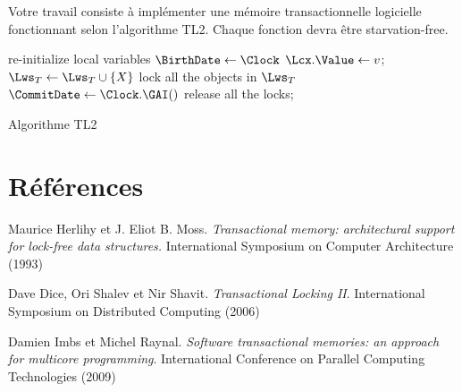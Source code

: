 \documentclass{td}
\begin{document}
Votre travail consiste à implémenter une mémoire transactionnelle logicielle fonctionnant selon l'algorithme TL2. Chaque fonction devra être starvation-free. 

\begin{algorithm}[t]
   {
    re-initialize local variables\;
    $\BirthDate \leftarrow \Clock$\;
  }
   {
    $\Lcx.\Value \leftarrow v$; 
    $\Lws_T\leftarrow \Lws_T \cup \{X\}$\;
  }
   {
  }
   {
    lock all the objects in $\Lws_T$\;
    $\CommitDate \leftarrow \Clock.\GAI()$\label{al:incr}\;
    release all the locks;
  }
  \caption{Algorithme TL2}
  \label{algo:TL2}
\end{algorithm}

\section{Références}

\renewcommand{\section}[2]{}%

\begin{thebibliography}{99}
  
  Maurice Herlihy et J. Eliot B. Moss. \emph{Transactional memory: architectural support for lock-free data structures.}
  International Symposium on Computer Architecture (1993)

  Dave Dice, Ori Shalev et Nir Shavit. \emph{Transactional Locking II}.
  International Symposium on Distributed Computing (2006)
  
  Damien Imbs et Michel Raynal. \emph{Software transactional memories: an approach for multicore programming}.
  International Conference on Parallel Computing Technologies (2009)

\end{thebibliography}
\end{document}
